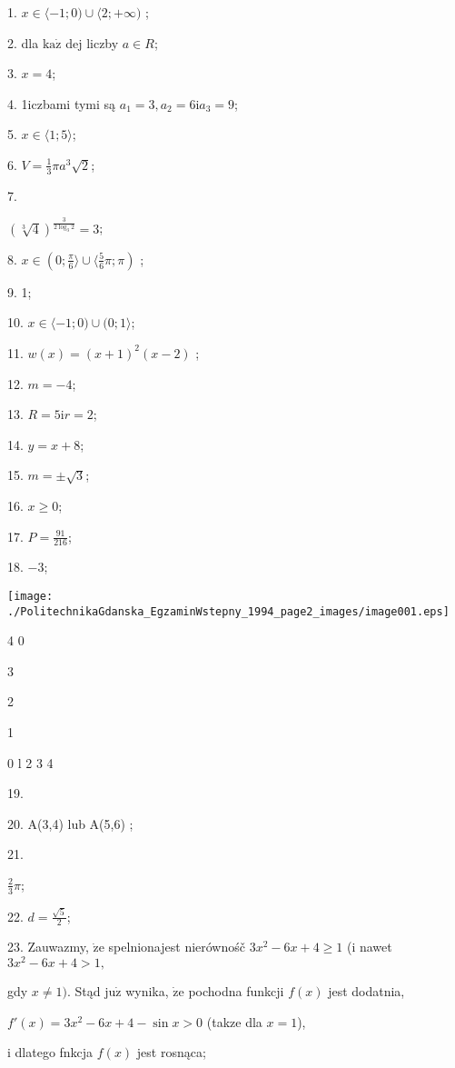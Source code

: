 \documentclass[a4paper,12pt]{article}
\begin{document}
1. $x\in\langle-1;0)\cup\langle 2;+\infty)$ ;

2. dla $\mathrm{k}\mathrm{a}\dot{\mathrm{z}}$ dej liczby $a\in R$;

3. $x=4$;

4. 1iczbami tymi są $a_{1}=3, a_{2}=6\mathrm{i}a_{3}=9$;

5. $ x\in\langle 1;5\rangle$;

6. $V=\displaystyle \frac{1}{3}\pi a^{3}\sqrt{2}$;

7.

$(\sqrt[3]{4})^{\frac{3}{2\log_{3}2}}=3$;

8. $x\displaystyle \in(0;\frac{\pi}{6}\rangle\cup\langle\frac{5}{6}\pi;\pi)$ ;

9. 1;

10. $ x\in\langle-1;0)\cup(0;1\rangle$;

11. $w(x)=(x+1)^{2}(x-2)$ ;

12. $m=-4$;

13. $R=5\mathrm{i}r=2$;

14. $y=x+8$;

15. $m=\pm\sqrt{3}$;

16. $x\geq 0$;

17. $P=\displaystyle \frac{91}{216}$;

18. $-3$;
\begin{center}
\texttt{[image: ./PolitechnikaGdanska\_EgzaminWstepny\_1994\_page2\_images/image001.eps]}
\end{center}
4  0

3

2

1

0 l  2 3 4

19.

20. A(3,4) lub A(5,6) ;

21.

$\displaystyle \frac{2}{3}\pi$;





22. $d=\displaystyle \frac{\sqrt{5}}{2}$;

23. Zauwazmy, $\dot{\mathrm{z}}\mathrm{e}$ spelnionajest nierównośč $3x^{2}-6x+4\geq 1$ (i nawet $3x^{2}-6x+4>1,$

gdy $x\neq 1)$. Stąd $\mathrm{j}\mathrm{u}\dot{\mathrm{z}}$ wynika, $\dot{\mathrm{z}}\mathrm{e}$ pochodna funkcji $f(x)$ jest dodatnia,

$f'(x)=3x^{2}-6x+4-\sin x>0$ (takze dla $x=1$),

i dlatego fnkcja $f(x)$ jest rosnąca;
\end{document}
